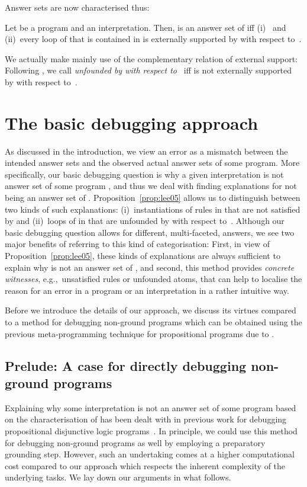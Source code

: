 \documentclass{tlp}
\newcommand{\wrt}{with respect to}
\newcommand{\egc}{e.g.,\ }
\begin{document}
Answer sets are now characterised thus:

\begin{proposition}\label{prop:lee05}
Let  be a program and  an interpretation. Then,
 is an answer set of  iff
{\rm (}i{\rm )}~ and
{\rm (}ii{\rm )}~every loop of  that is contained in  is externally supported by  \wrt~.
\end{proposition}

We actually make mainly use of the complementary relation of external support: Following , we call  \emph{unfounded by  \wrt\ } iff  is not externally supported by 
 \wrt\ . 

\section{The basic debugging approach}

As discussed in the introduction, 
we view  an error as a mismatch between the intended answer sets and the observed actual answer sets of some program. 
More specifically, our basic debugging question is why a given interpretation  is not answer set of some program , and
thus we deal with  finding explanations for  not being an answer set of .
Proposition~\ref{prop:lee05} allows us to distinguish between two kinds of such explanations:
(i)~instantiations of rules in  that are not satisfied by  and (ii)~loops of  in  that are unfounded by  \wrt\ .
Although our basic debugging question
allows for different, multi-faceted, answers,
we see two major benefits of referring to this kind of  categorisation:
First, in view of Proposition~\ref{prop:lee05}, these kinds of explanations are
always sufficient to explain why  is not an answer set of , and second,
this method provides \emph{concrete witnesses}, \egc unsatisfied rules or unfounded atoms,
that can help to localise the reason for an error in a program or an interpretation in a rather intuitive way.

Before we introduce the details of our approach, we discuss its virtues compared to a method for debugging non-ground programs which can be obtained using the previous meta-programming technique for propositional programs due to .

\subsection{Prelude: A case for directly debugging non-ground programs}

Explaining why some interpretation is not an answer set of some program based on the characterisation of  has been dealt with in previous work for 
debugging propositional disjunctive logic programs~\cite{gebser08}. 
In principle, we could use this method for debugging non-ground programs as well by employing a preparatory  grounding step.
However, such an undertaking comes at a higher computational cost compared to our approach which respects the
inherent complexity of the underlying tasks.
We lay down our arguments in what follows.
\end{document}

